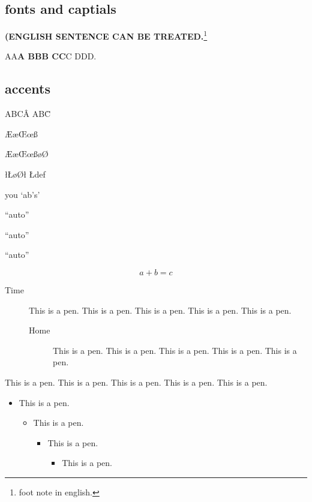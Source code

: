 \documentclass[lualatex,ja=standard,jafont=haranoaji]{bxjsarticle}
\newcommand\?{\BrailleReading}
\numberwithin{subsection}{section}
\numberwithin{equation}{subsection}
\begin{document}
\subsection{fonts and captials}
{\bf (ENGLISH SENTENCE CAN BE TREATED.}\footnote{foot note in english.}

AA\textbf{A BBB CC}C DDD.


\subsection{accents}

ABC\^A AB\"C

\AE\ae\OE\oe\ss

ÆæŒœß\o\O

\l\L øØł Łdef


you `ab's'%

``auto''

``auto''

``auto''

\[a+b=c\]

\begin{description}
\item[Time] This is a pen. This is a pen. This is a pen. This is a pen. This is a pen.
  \begin{description}
  \item[Home] This is a pen. This is a pen. This is a pen. This is a pen. This is a pen.
  \end{description}
\end{description}

This is a pen. This is a pen. This is a pen. This is a pen. This is a pen.

\begin{itemize}
\item This is a pen.
\begin{itemize}
\item This is a pen.
\begin{itemize}
\item This is a pen.
\begin{itemize}
\item This is a pen.
\end{itemize}
\end{itemize}
\end{itemize}
\end{itemize}
\end{document}
